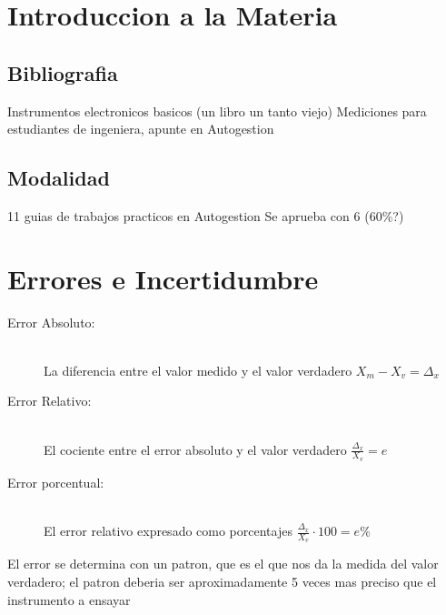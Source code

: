 \chapter*{Introduccion a la Materia}
\section*{Bibliografia}
Instrumentos electronicos basicos (un libro un tanto viejo)
Mediciones para estudiantes de ingeniera, apunte en Autogestion

\section*{Modalidad}
11 guias de trabajos practicos en Autogestion
Se aprueba con 6 (60\%?)

\chapter{Errores e Incertidumbre}

\begin{description}
  \item[Error Absoluto:] \hfill \\ La diferencia entre el valor medido y el valor verdadero
    $X_m - X_v = \Delta_x$
  \item[Error Relativo:] \hfill \\ El cociente entre el error absoluto y el valor verdadero
    $\frac{\Delta_x}{X_v} = e$
  \item[Error porcentual:] \hfill \\ El error relativo expresado como porcentajes
    $\frac{\Delta_x}{X_v} \cdot 100 = e\%$
\end{description}

El error se determina con un patron, que es el que nos da la medida 
del valor verdadero; el patron deberia ser aproximadamente 5 veces
mas preciso que el instrumento a ensayar


